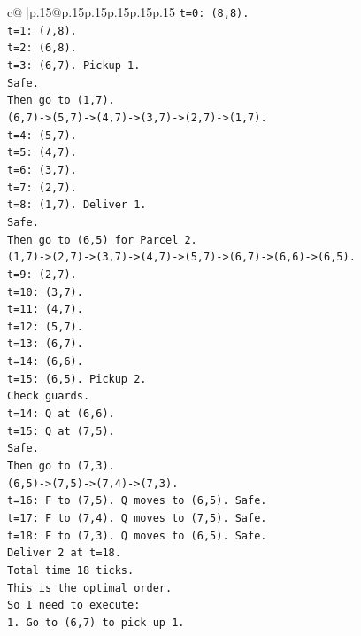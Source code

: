 \documentclass{article}
\begin{document}
{\begin{supertabular}{c@{$\;$}|p{.15\linewidth}@{}p{.15\linewidth}p{.15\linewidth}p{.15\linewidth}p{.15\linewidth}p{.15\linewidth}}
{{{\texttt{t=0: (8,8).} \\
\texttt{t=1: (7,8).} \\
\texttt{t=2: (6,8).} \\
\texttt{t=3: (6,7). Pickup 1.} \\
\texttt{Safe.} \\
\texttt{Then go to (1,7).} \\
\texttt{(6,7){-}>(5,7){-}>(4,7){-}>(3,7){-}>(2,7){-}>(1,7).} \\
\texttt{t=4: (5,7).} \\
\texttt{t=5: (4,7).} \\
\texttt{t=6: (3,7).} \\
\texttt{t=7: (2,7).} \\
\texttt{t=8: (1,7). Deliver 1.} \\
\texttt{Safe.} \\
\texttt{Then go to (6,5) for Parcel 2.} \\
\texttt{(1,7){-}>(2,7){-}>(3,7){-}>(4,7){-}>(5,7){-}>(6,7){-}>(6,6){-}>(6,5).} \\
\texttt{t=9: (2,7).} \\
\texttt{t=10: (3,7).} \\
\texttt{t=11: (4,7).} \\
\texttt{t=12: (5,7).} \\
\texttt{t=13: (6,7).} \\
\texttt{t=14: (6,6).} \\
\texttt{t=15: (6,5). Pickup 2.} \\
\texttt{Check guards.} \\
\texttt{t=14: Q at (6,6).} \\
\texttt{t=15: Q at (7,5).} \\
\texttt{Safe.} \\
\texttt{Then go to (7,3).} \\
\texttt{(6,5){-}>(7,5){-}>(7,4){-}>(7,3).} \\
\texttt{t=16: F to (7,5). Q moves to (6,5). Safe.} \\
\texttt{t=17: F to (7,4). Q moves to (7,5). Safe.} \\
\texttt{t=18: F to (7,3). Q moves to (6,5). Safe.} \\
\texttt{Deliver 2 at t=18.} \\
\texttt{Total time 18 ticks.} \\
\texttt{This is the optimal order.} \\
\texttt{So I need to execute:} \\
\texttt{1. Go to (6,7) to pick up 1.} \\
}}}
\end{supertabular}}
\end{document}
